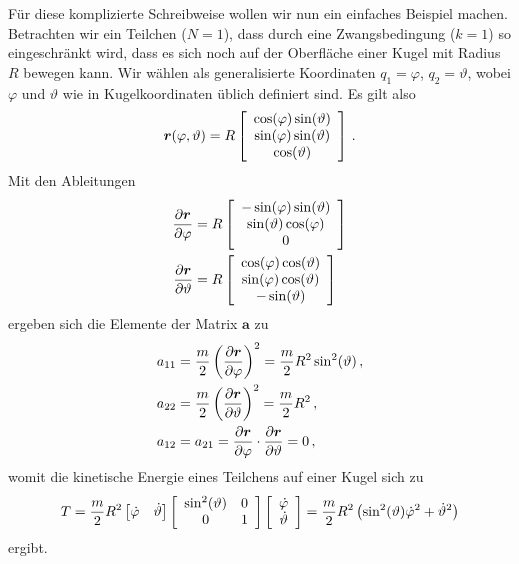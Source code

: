 \documentclass[paper=a4, fontsize=11.0pt, abstractoff, DIV12]{scrartcl}
\begin{document}
Für diese komplizierte Schreibweise wollen wir nun ein einfaches Beispiel
machen. Betrachten wir ein Teilchen ($N=1$), dass durch eine Zwangsbedingung
($k=1$) so eingeschränkt wird, dass es sich noch auf der Oberfläche einer Kugel
mit Radius $R$ bewegen kann. Wir wählen als generalisierte Koordinaten
$q_1 = \varphi$, $q_2 = \vartheta$, wobei $\varphi$ und $\vartheta$ wie in
Kugelkoordinaten üblich definiert sind. Es gilt also
\begin{equation}
{\ensuremath{\boldsymbol{r}}}(\varphi, \vartheta) = R\left[ \begin{array}{c} \cos(\varphi)\sin(\vartheta) \\ \sin(\varphi)\sin(\vartheta) \\ \cos(\vartheta) \end{array} \right]\,.
\end{equation}
Mit den Ableitungen
\begin{align}
\frac{\partial {\ensuremath{\boldsymbol{r}}}}{\partial \varphi} &= R\left[ \begin{array}{c} -\sin(\varphi)\sin(\vartheta) \\ \sin(\vartheta)\cos(\varphi) \\ 0 \end{array} \right]\\
\frac{\partial {\ensuremath{\boldsymbol{r}}}}{\partial \vartheta} &= R\left[ \begin{array}{c} \cos(\varphi)\cos(\vartheta) \\ \sin(\varphi)\cos(\vartheta) \\ -\sin(\vartheta) \end{array} \right]
\end{align}
ergeben sich die Elemente der Matrix $\mathbf{a}$ zu
\begin{align}
a_{11} &= \frac{m}{2} \left(\frac{\partial {\ensuremath{\boldsymbol{r}}}}{\partial \varphi}\right)^2 = \frac{m}{2} R^2 \sin^2(\vartheta)\, ,\\
a_{22} &= \frac{m}{2} \left(\frac{\partial {\ensuremath{\boldsymbol{r}}}}{\partial \vartheta}\right)^2 = \frac{m}{2} R^2\, ,\\
a_{12} &= a_{21} = \frac{\partial {\ensuremath{\boldsymbol{r}}}}{\partial \varphi}\cdot\frac{\partial {\ensuremath{\boldsymbol{r}}}}{\partial \vartheta} = 0\, ,
\end{align}
womit die kinetische Energie eines Teilchens auf einer Kugel sich zu
\begin{equation}
T = \frac{m}{2}R^2 \left[ \dot\varphi\quad\dot\vartheta \right] \left[ \begin{array}{cc} \sin^2(\vartheta) & 0 \\ 0 & 1 \end{array} \right] \left[ \begin{array}{c} \dot\varphi \\ \dot\vartheta \end{array} \right] = \frac{m}{2} R^2 \left(\sin^2(\vartheta)\dot{\varphi}^2 + \dot{\vartheta}^2\right)
\end{equation}
ergibt.
\end{document}
